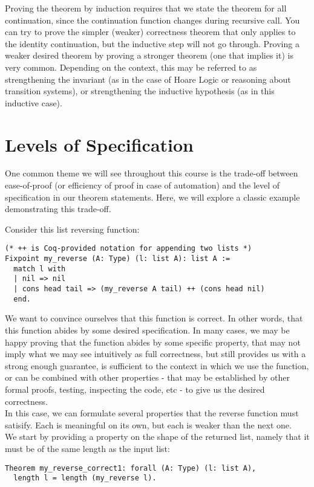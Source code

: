 \documentclass{article}
\begin{document}
Proving the theorem by induction requires that we state the theorem for all continuation, since the continuation function
changes during recursive call. You can try to prove the simpler (weaker) correctness theorem that only applies
to the identity continuation, but the inductive step will not go through. Proving a weaker desired theorem
by proving a stronger theorem (one that implies it) is very common. Depending on the context, this may be
referred to as strengthening the invariant (as in the case of Hoare Logic or reasoning about transition systems),
or strengthening the inductive hypothesis (as in this inductive case).

\section{Levels of Specification}
One common theme we will see throughout this course is the trade-off between ease-of-proof (or efficiency of proof in case of automation) and the level of specification
in our theorem statements. Here, we will explore a classic example demonstrating this trade-off.

Consider this list reversing function:
\begin{verbatim}
(* ++ is Coq-provided notation for appending two lists *)
Fixpoint my_reverse (A: Type) (l: list A): list A :=
  match l with
  | nil => nil
  | cons head tail => (my_reverse A tail) ++ (cons head nil)
  end.
\end{verbatim}

We want to convince ourselves that this function is correct. In other words,
that this function abides by some desired specification. In many cases, we may be
happy proving that the function abides by some specific property, that may not imply what we may see intuitively as
full correctness, but still provides us with a strong enough guarantee, is sufficient to the context in which we use the function, or
can be combined with other properties - that may be established by other formal proofs, testing, inspecting
the code, etc - to give us the desired correctness. \\

In this case, we can formulate several properties that the reverse function must satisify. Each
is meaningful on its own, but each is weaker than the next one. \\

We start by providing a property on the shape of the returned list, namely that it must
be of the same length as the input list:
\begin{verbatim}
Theorem my_reverse_correct1: forall (A: Type) (l: list A),
  length l = length (my_reverse l).
\end{verbatim}
\end{document}
